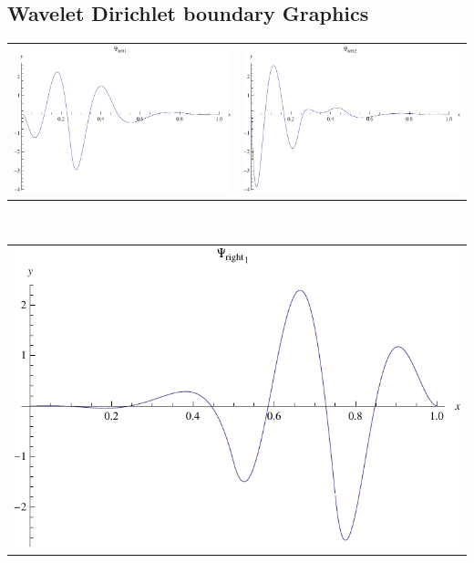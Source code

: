 \documentclass{article}
\begin{document}
\begin{landscape}
\subsection{Wavelet Dirichlet boundary Graphics}
\begin{tabular}{cc}
\includegraphics[width=10.cm]{quintic_wavelet_dleft_1.pdf}& \includegraphics[width=10.cm]{quintic_wavelet_dleft_2.pdf} \\
\end{tabular} 
 \\ 
\begin{tabular}{c}
\includegraphics[width=20.cm]{quintic_wavelet_dright_1.pdf}\end{tabular} 
 \end{landscape}
\end{document}
